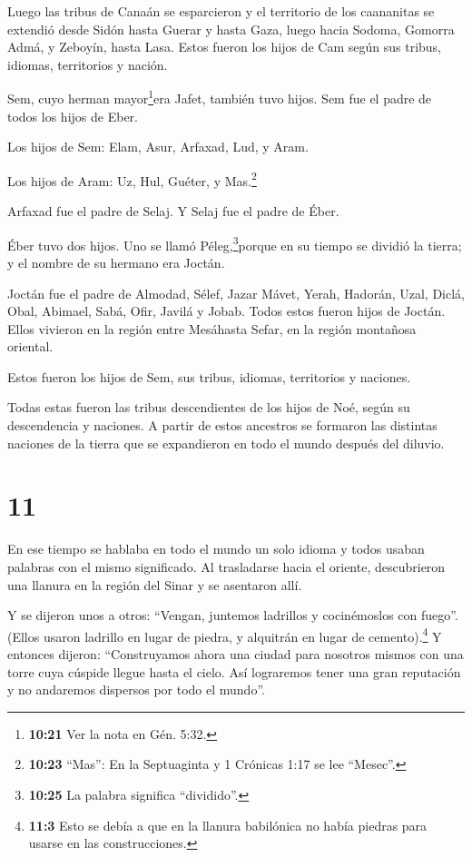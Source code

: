 Luego las tribus de Canaán se esparcieron  y el territorio
de los caananitas se extendió desde Sidón hasta Guerar y hasta Gaza,
luego hacia Sodoma, Gomorra Admá, y Zeboyín, hasta Lasa. 
Estos fueron los hijos de Cam según sus tribus, idiomas, territorios y
nación.

 Sem, cuyo herman mayor\footnote{\textbf{10:21} Ver la nota
  en Gén. 5:32.}era Jafet, también tuvo hijos. Sem fue el padre de todos
los hijos de Eber.

 Los hijos de Sem: Elam, Asur, Arfaxad, Lud, y Aram.

 Los hijos de Aram: Uz, Hul, Guéter, y Mas.\footnote{\textbf{10:23}
  ``Mas'': En la Septuaginta y 1 Crónicas 1:17 se lee ``Mesec''.}

 Arfaxad fue el padre de Selaj. Y Selaj fue el padre de
Éber.

 Éber tuvo dos hijos. Uno se llamó Péleg,\footnote{\textbf{10:25}
  La palabra significa ``dividido''.}porque en su tiempo se dividió la
tierra; y el nombre de su hermano era Joctán.

 Joctán fue el padre de Almodad, Sélef, Jazar Mávet, Yerah,
 Hadorán, Uzal, Diclá,  Obal, Abimael, Sabá,
 Ofir, Javilá y Jobab. Todos estos fueron hijos de Joctán.
 Ellos vivieron en la región entre Mesáhasta Sefar, en la
región montañosa oriental.

 Estos fueron los hijos de Sem, sus tribus, idiomas,
territorios y naciones.

 Todas estas fueron las tribus descendientes de los hijos
de Noé, según su descendencia y naciones. A partir de estos ancestros se
formaron las distintas naciones de la tierra que se expandieron en todo
el mundo después del diluvio.

\hypertarget{section-10}{%
\section{11}\label{section-10}}

 En ese tiempo se hablaba en todo el mundo un solo idioma y
todos usaban palabras con el mismo significado.  Al
trasladarse hacia el oriente, descubrieron una llanura en la región del
Sinar y se asentaron allí.

 Y se dijeron unos a otros: ``Vengan, juntemos ladrillos y
cocinémoslos con fuego''. (Ellos usaron ladrillo en lugar de piedra, y
alquitrán en lugar de cemento).\footnote{\textbf{11:3} Esto se debía a
  que en la llanura babilónica no había piedras para usarse en las
  construcciones.}  Y entonces dijeron: ``Construyamos ahora
una ciudad para nosotros mismos con una torre cuya cúspide llegue hasta
el cielo. Así lograremos tener una gran reputación y no andaremos
dispersos por todo el mundo''.

